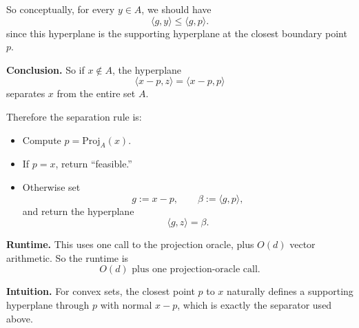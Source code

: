 \documentclass[10pt]{article}
\begin{document}
So conceptually, for every \(y\in A\), we should have
\[
\langle g,y\rangle \le \langle g,p\rangle.
\]
since this hyperplane is the supporting hyperplane at the closest boundary point \(p\).

\medskip
\textbf{Conclusion.}
So if \(x\notin A\), the hyperplane
\[
\boxed{\langle x-p, z\rangle = \langle x-p, p\rangle}
\]
separates \(x\) from the entire set \(A\).

Therefore the separation rule is:
\begin{itemize}
\item Compute \(p=\mathrm{Proj}_A(x)\).
\item If \(p=x\), return ``feasible.''
\item Otherwise set
\[
g:=x-p,
\qquad
\beta:=\langle g,p\rangle,
\]
and return the hyperplane
\[
\langle g,z\rangle = \beta.
\]
\end{itemize}

\medskip
\textbf{Runtime.}
This uses one call to the projection oracle, plus \(O(d)\) vector arithmetic. So the runtime is
\[
\boxed{O(d) \text{ plus one projection-oracle call}.}
\]

\textbf{Intuition.}
For convex sets, the closest point $p$ to $x$ naturally defines a supporting hyperplane through $p$ with normal $x-p$, which is exactly the separator used above.
\end{document}

